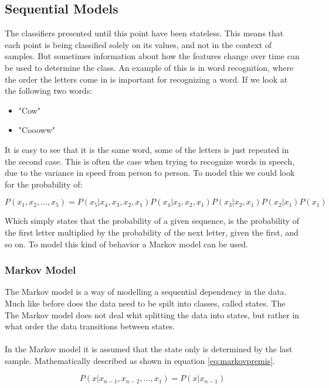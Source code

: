 \subsection{Sequential Models}
The classifiers presented until this point have been stateless. This means that each point is being classified solely on its values, and not in the context of samples. But sometimes information about how the features change over time can be used to determine the class. An example of this is in word recognition, where the order the letters come in is important for recognizing a word.  If we look at the following two words:

\begin{itemize}
  \item "Cow"
  \item "Coooww"
\end{itemize}

It is easy to see that it is the same word, some of the letters is just repeated in the second case. This is often the case when trying to recognize words in speech, due to the variance in speed from person to person. To model this we could look for the probability of: 

\begin{equation}
 P(x_1, x_2, ..., x_5) = P(x_5| x_4,x_3,x_2, x_1) P(x_4| x_3,x_2, x_1) P(x_3|x_2, x_1) P(x_2|x_1) P(x_1)
 \label{eq:seqmodel}
\end{equation}

Which simply states that the probability of a given sequence, is the probability of the first letter multiplied by the probability of the next letter, given the first, and so on. To model this kind of behavior a Markov model can be used.

\subsubsection{Markov Model}
The Markov model is a way of modelling a sequential dependency in the data. Much like before does the data need to be spilt into classes, called states. The The Markov model does not deal whit splitting the data into states, but rather in what order the data transitions between states.\\\ \\

In the Markov model it is assumed that the state only is determined by the last sample. Mathematically described as shown in equation \ref{eq:markovpremis}.

\begin{equation}
 P(x| x_{n-1}, x_{n-2}, ..., x_1) = P(x| x_{n-1}) 
 \label{eq:markovpremis}
\end{equation}

